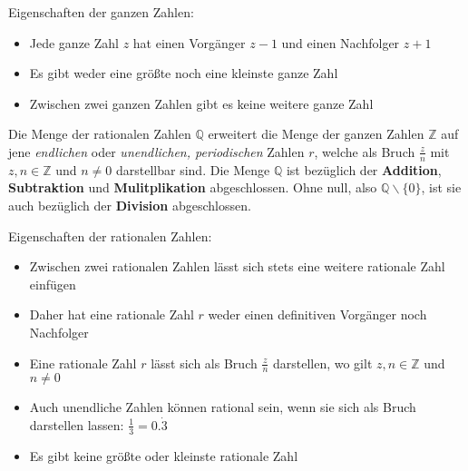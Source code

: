 Eigenschaften der ganzen Zahlen:

\begin{itemize}
	\item Jede ganze Zahl $z$ hat einen Vorg\"{a}nger $z - 1$ und einen Nachfolger $z + 1$
	\item Es gibt weder eine gr\"{o}\ss{}te noch eine kleinste ganze Zahl
	\item Zwischen zwei ganzen Zahlen gibt es keine weitere ganze Zahl
\end{itemize}

\pagebreak


Die Menge der rationalen Zahlen $\mathbb{Q}$ erweitert die Menge der ganzen Zahlen $\mathbb{Z}$ auf jene \emph{endlichen} oder \emph{unendlichen, periodischen} Zahlen $r$, welche als Bruch $\frac{z}{n}$ mit $z, n \in \mathbb{Z}$ und $n \neq 0$ darstellbar sind. Die Menge $\mathbb{Q}$ ist bez\"{u}glich der \textbf{Addition}, \textbf{Subtraktion} und \textbf{Mulitplikation} abgeschlossen. Ohne null, also $\mathbb{Q}\backslash\{0\}$, ist sie auch bez\"{u}glich der \textbf{Division} abgeschlossen.

\begin{figure}[h!]
\end{figure}
Eigenschaften der rationalen Zahlen:
\begin{itemize}
	\item Zwischen zwei rationalen Zahlen l\"{a}sst sich stets eine weitere rationale Zahl einf\"{u}gen
	\item Daher hat eine rationale Zahl $r$ weder einen definitiven Vorg\"{a}nger noch Nachfolger
	\item Eine rationale Zahl $r$ l\"{a}sst sich als Bruch $\frac{z}{n}$ darstellen, wo gilt $z, n \in \mathbb{Z}$ und $n \neq 0$
	\item Auch unendliche Zahlen k\"{o}nnen rational sein, wenn sie sich als Bruch darstellen lassen: $\frac{1}{3} = 0.\dot{3}$
	\item Es gibt keine gr\"{o}\ss{}te oder kleinste rationale Zahl
\end{itemize}

